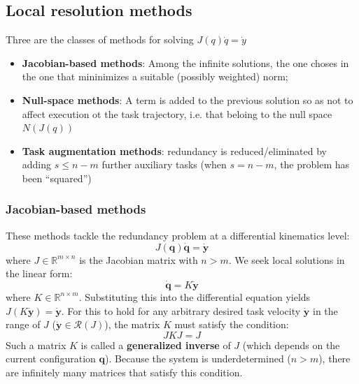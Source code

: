 \begin{itemize}
\end{itemize}

\subsection{Local resolution methods}
Three are the classes of methods for solving $J(q)\dot{q}=\dot{y}$
\begin{itemize}
    \item \textbf{Jacobian-based methods}: Among the infinite solutions, the one choses in the one that mininimizes a suitable (possibly weighted) norm;
    \item \textbf{Null-space methods}: A term is added to the previous solution so as not to affect execution ot the task trajectory, i.e. that beloing to the null space $N(J(q))$
    \item \textbf{Task augmentation methods}: redundancy is reduced/eliminated by adding $s \leq n-m$ further auxiliary tasks (when $s = n-m$, the problem has been “squared”)
\end{itemize}

\subsubsection{Jacobian-based methods}
These methods tackle the redundancy problem at a differential kinematics level:
\begin{equation}
    J(\mathbf{q})\dot{\mathbf{q}} = \dot{\mathbf{y}}
\end{equation}
where $J \in \mathbb{R}^{m \times n}$ is the Jacobian matrix with $n > m$. We seek local solutions in the linear form:
\begin{equation}
    \dot{\mathbf{q}} = K\dot{\mathbf{y}}
\end{equation}
where $K \in \mathbb{R}^{n \times m}$. Substituting this into the differential equation yields $J(K\dot{\mathbf{y}}) = \dot{\mathbf{y}}$. For this to hold for any arbitrary desired task velocity $\dot{\mathbf{y}}$ in the range of $J$ ($\dot{\mathbf{y}} \in \mathcal{R}(J)$), the matrix $K$ must satisfy the condition:
\begin{equation}
    JKJ = J
\end{equation}
Such a matrix $K$ is called a \textbf{generalized inverse} of $J$ (which depends on the current configuration $\mathbf{q}$). Because the system is underdetermined ($n > m$), there are infinitely many matrices that satisfy this condition.

